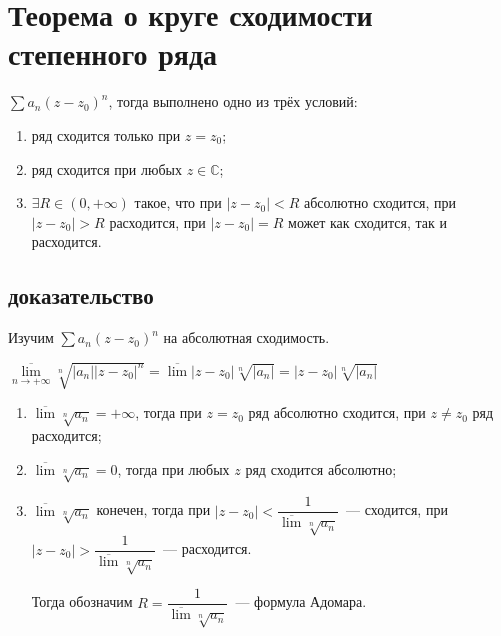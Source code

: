 \documentclass{article}
\begin{document}
    \newpage
    
    \section{Теорема о круге сходимости степенного ряда}
    
        $\sum a_n (z - z_0)^n$, тогда выполнено одно из трёх условий:
        
        \begin{enumerate}
        
            \item ряд сходится только при $z = z_0$;
            
            \item ряд сходится при любых $z \in \mathbb{C}$;
            
            \item $\exists R \in (0, +\infty)$ такое, что при $|z - z_0| < R$ абсолютно сходится, при $|z - z_0| > R$ расходится, при $|z - z_0| = R$ может как сходится, так и расходится.
            
        \end{enumerate}
        
        \subsection{доказательство}
        
            Изучим $\sum a_n (z - z_0)^n$ на абсолютная сходимость.
            
            $\overline{\lim\limits_{n \rightarrow +\infty}} \sqrt[n]{|a_n||z - z_0|^n} = \overline{\lim} |z - z_0| \sqrt[n]{|a_n|} = |z - z_0| \sqrt[n]{|a_n|}$
            
            \begin{enumerate}
            
                \item $\overline{\lim} \sqrt[n]{a_n} = +\infty$, тогда при $z = z_0$ ряд абсолютно сходится, при $z \neq z_0$ ряд расходится;
                
                \item $\overline{\lim} \sqrt[n]{a_n} = 0$, тогда при любых $z$ ряд сходится абсолютно;
                
                \item $\overline{\lim} \sqrt[n]{a_n}$ конечен, тогда при $|z - z_0| < \dfrac{1}{\overline{\lim}\sqrt[n]{a_n}}$~--- сходится, при $|z - z_0| > \dfrac{1}{\overline{\lim}\sqrt[n]{a_n}}$~--- расходится.
                
                    Тогда обозначим $R = \dfrac{1}{\overline{\lim}\sqrt[n]{a_n}}$~--- формула Адомара.
                
            \end{enumerate}
            
\end{document}
